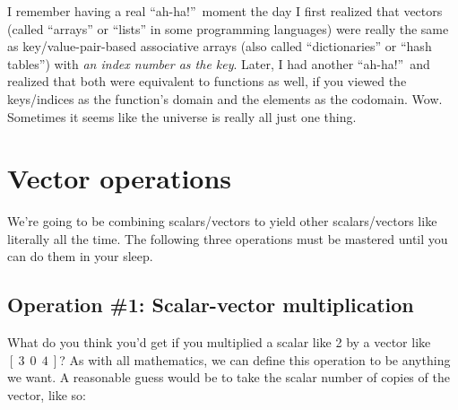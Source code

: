 
I remember having a real ``ah-ha!''~moment the day I first realized that
vectors (called ``arrays'' or ``lists'' in some programming languages) were
really the same as key/value-pair-based associative arrays (also called
``dictionaries'' or ``hash tables'') with \textit{an index number as the key}.
Later, I had another ``ah-ha!''~and realized that both were equivalent to
functions as well, if you viewed the keys/indices as the function's domain and
the elements as the codomain. Wow. Sometimes it seems like the universe is
really all just one thing.

%
%
%
%
%
%
%
%
%
%
%
%
%
%
%
%
%
%
%
%
%
%
%
%
%
%
%
%
%
%
%
%
%
%
%
%
%
%
%
%
%


\section{Vector operations}
\label{vectorOps}

We're going to be combining scalars/vectors to yield other scalars/vectors like
literally all the time. The following three operations must be mastered until
you can do them in your sleep.

\subsection{Operation \#1: Scalar-vector multiplication}

\label{scalarVectorMultiplication}

What do you think you'd get if you multiplied a scalar like 2 by a vector like
$[\ 3\ \ 0\ \ 4\ ]$? As with all mathematics, we can define this operation to
be anything we want. A reasonable guess would be to take the scalar number of
copies of the vector, like so:


